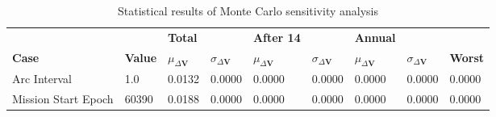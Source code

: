 \begin{table}[h!]
\centering
\begin{tabular}{lllllllll}
 &  & \cellcolor[HTML]{EFEFEF}\textbf{Total} &  & \cellcolor[HTML]{EFEFEF}\textbf{After 14} & & \cellcolor[HTML]{EFEFEF}\textbf{Annual} & &\\
\rowcolor[HTML]{EFEFEF} 
\textbf{Case} & \textbf{Value} & \textbf{$\mu_{\Delta \boldsymbol{V}}$} & \textbf{$\sigma_{\Delta \boldsymbol{V}}$} & \textbf{$\mu_{\Delta \boldsymbol{V}}$} & \textbf{$\sigma_{\Delta \boldsymbol{V}}$} & \textbf{$\mu_{\Delta \boldsymbol{V}}$} & \textbf{$\sigma_{\Delta \boldsymbol{V}}$} & \textbf{Worst} \\ 
Arc Interval & 1.0 & 0.0132 & 0.0000 & 0.0000 & 0.0000 & 0.0000 & 0.0000 & 0.0000 \\ 
Mission Start Epoch & 60390 & 0.0188 & 0.0000 & 0.0000 & 0.0000 & 0.0000 & 0.0000 & 0.0000 \\ 
\end{tabular}
\caption{Statistical results of Monte Carlo sensitivity analysis}
\label{tab:SensitivityAnalysis}
\end{table}